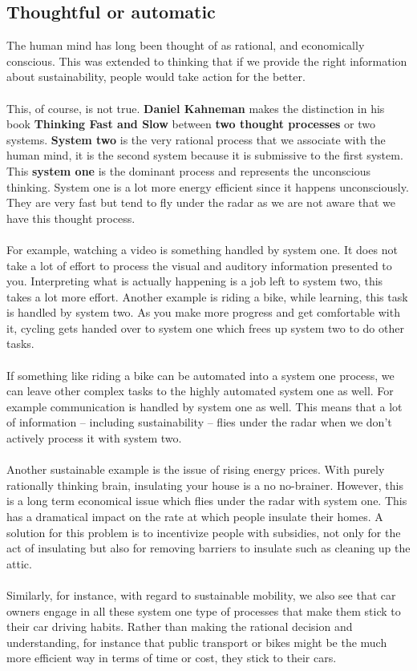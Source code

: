 \documentclass[../summary.tex]{subfiles}
\begin{document}
		\newpage	
		\subsection{Thoughtful or automatic}
			The human mind has long been thought of as rational, and economically conscious. This was extended to thinking that if we provide the right information about sustainability, people would take action for the better.
			\\\\
			This, of course, is not true. \textbf{Daniel Kahneman} makes the distinction in his book \textbf{Thinking Fast and Slow} between \textbf{two thought processes} or two systems. \textbf{System two} is the very rational process that we associate with the human mind, it is the second system because it is submissive to the first system. This \textbf{system one} is the dominant process and represents the unconscious thinking. System one is a lot more energy efficient since it happens unconsciously. They are very fast but tend to fly under the radar as we are not aware that we have this thought process. 
			\\\\
			For example, watching a video is something handled by system one. It does not take a lot of effort to process the visual and auditory information presented to you. Interpreting what is actually happening is a job left to system two, this takes a lot more effort. Another example is riding a bike, while learning, this task is handled by system two. As you make more progress and get comfortable with it, cycling gets handed over to system one which frees up system two to do other tasks. \\\\
			If something like riding a bike can be automated into a system one process, we can leave other complex tasks to the highly automated system one as well. For example communication is handled by system one as well. This means that a lot of information -- including sustainability -- flies under the radar when we don't actively process it with system two. 
			\\\\
			Another sustainable example is the issue of rising energy prices. With purely rationally thinking brain, insulating your house is a no no-brainer. However, this is a long term economical issue which flies under the radar with system one. This has a dramatical impact on the rate at which people insulate their homes. A solution for this problem is to incentivize people with subsidies, not only for the act of insulating but also for removing barriers to insulate such as cleaning up the attic. 
			\\\\
			Similarly, for instance, with regard to sustainable mobility, we also see that car owners engage in all these system one type of processes that make them stick to their car driving habits. Rather than making the rational decision and understanding, for instance that public transport or bikes might be the much more efficient way in terms of time or cost, they stick to their cars.
			\newpage
\end{document}

